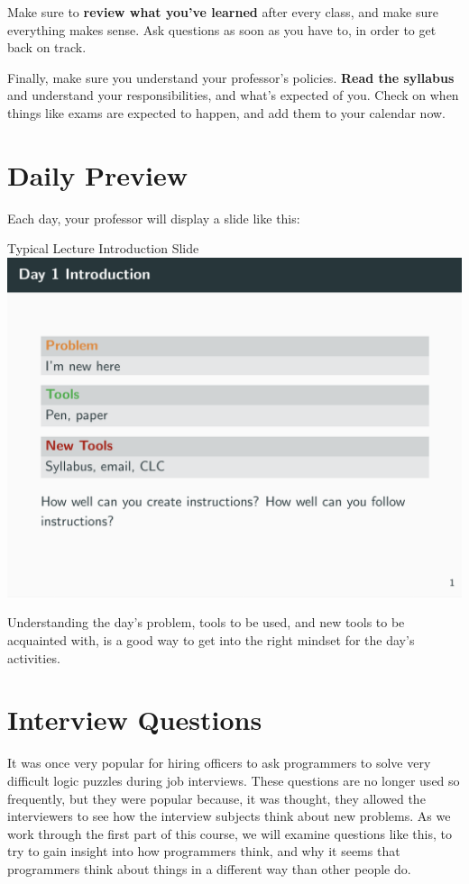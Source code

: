 Make sure to \textbf{review what you've learned} after every class, and make sure everything makes sense.  Ask questions as soon as you have to, in order to get back on track.

Finally, make sure you understand your professor's policies.  \textbf{Read the syllabus} and understand your responsibilities, and what's expected of you.  Check on when things like exams are expected to happen, and add them to your calendar now.

\section{Daily Preview}

Each day, your professor will display a slide like this:
\begin{myfigure}{Typical Lecture Introduction Slide}
	\includegraphics[scale=0.25]{day1slide}
\end{myfigure}

Understanding the day's problem, tools to be used, and new tools to be acquainted with, is a good way to get into the right mindset for the day's activities.

\section{Interview Questions}

It was once very popular for hiring officers to ask programmers to solve very difficult logic puzzles during job interviews.  These questions are no longer used so frequently, but they were popular because, it was thought, they allowed the interviewers to see how the interview subjects think about new problems.  As we work through the first part of this course, we will examine questions like this, to try to gain insight into how programmers think, and why it seems that programmers think about things in a different way than other people do.

